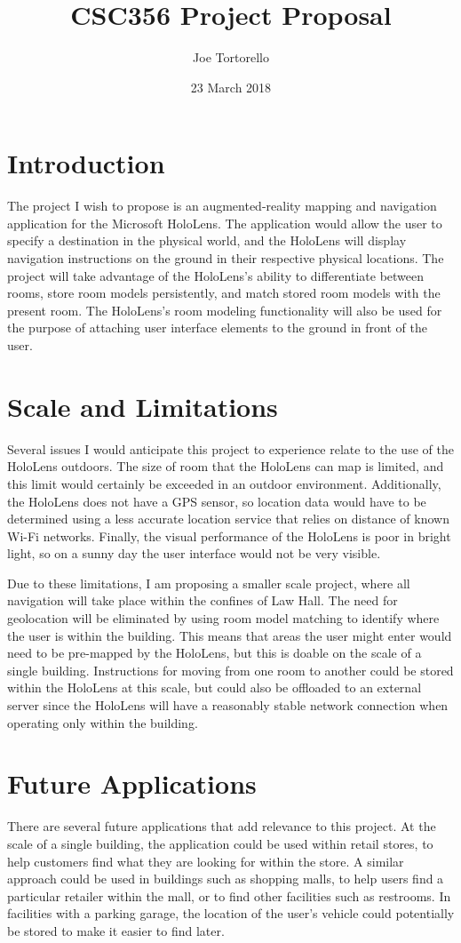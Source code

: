 \documentclass[11pt]{article}
\title{CSC356 Project Proposal\vspace{-2ex}}
\author{Joe Tortorello}
\date{\vspace{-2ex}23 March 2018\vspace{-2ex}}
\begin{document}
\maketitle
\section{Introduction}
The project I wish to propose is an augmented-reality mapping and navigation application
for the Microsoft HoloLens. The application would allow the user to specify a destination
in the physical world, and the HoloLens will display navigation instructions on the ground
in their respective physical locations. The project will take advantage of the HoloLens's
ability to differentiate between rooms, store room models persistently, and match stored
room models with the present room. The HoloLens's room modeling functionality will also be
used for the purpose of attaching user interface elements to the ground in front of the
user.
\section{Scale and Limitations}
Several issues I would anticipate this project to experience relate to the use of the
HoloLens outdoors. The size of room that the HoloLens can map is limited, and this limit
would certainly be exceeded in an outdoor environment. Additionally, the HoloLens does
not have a GPS sensor, so location data would have to be determined using a less accurate
location service that relies on distance of known Wi-Fi networks. Finally, the visual
performance of the HoloLens is poor in bright light, so on a sunny day the user interface
would not be very visible.

Due to these limitations, I am proposing a smaller scale project, where all navigation
will take place within the confines of Law Hall. The need for geolocation will be
eliminated by using room model matching to identify where the user is within the
building. This means that areas the user might enter would need to be pre-mapped by the
HoloLens, but this is doable on the scale of a single building. Instructions for moving
from one room to another could be stored within the HoloLens at this scale, but could also
be offloaded to an external server since the HoloLens will have a reasonably stable
network connection when operating only within the building.

\section{Future Applications}
There are several future applications that add relevance to this project. At the scale of
a single building, the application could be used within retail stores, to help customers
find what they are looking for within the store. A similar approach could be used in
buildings such as shopping malls, to help users find a particular retailer within the
mall, or to find other facilities such as restrooms. In facilities with a parking garage,
the location of the user's vehicle could potentially be stored to make it easier to find
later.
\end{document}
